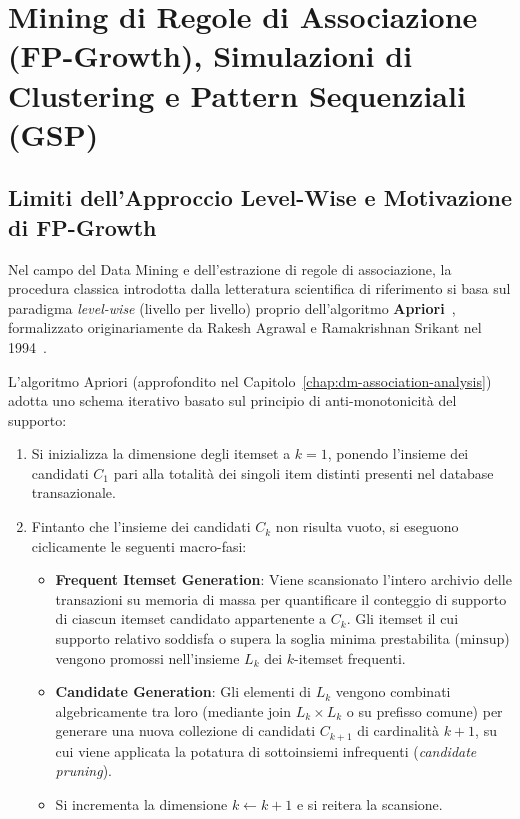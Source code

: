 \chapter{Mining di Regole di Associazione (FP-Growth), Simulazioni di Clustering e Pattern Sequenziali (GSP)}
\label{chap:dm-fp-growth-clustering-gsp}


\FloatBarrier
\section{Limiti dell'Approccio Level-Wise e Motivazione di FP-Growth}
\label{sec:dm-fp-motivation}

Nel campo del Data Mining e dell'estrazione di regole di associazione, la procedura classica introdotta dalla letteratura scientifica di riferimento si basa sul paradigma \textit{level-wise} (livello per livello) proprio dell'algoritmo \textbf{Apriori}~\cite{tan2018, agrawal1994}, formalizzato originariamente da Rakesh Agrawal e Ramakrishnan Srikant nel 1994~\cite{agrawal1994}.

L'algoritmo Apriori (approfondito nel Capitolo~\ref{chap:dm-association-analysis}) adotta uno schema iterativo basato sul principio di anti-monotonicità del supporto:
\begin{enumerate}[label=\textbf{\arabic*.}]
    \item Si inizializza la dimensione degli itemset a $k=1$, ponendo l'insieme dei candidati $C_1$ pari alla totalità dei singoli item distinti presenti nel database transazionale.
    \item Fintanto che l'insieme dei candidati $C_k$ non risulta vuoto, si eseguono ciclicamente le seguenti macro-fasi:
    \begin{itemize}
        \item \textbf{Frequent Itemset Generation}: Viene scansionato l'intero archivio delle transazioni su memoria di massa per quantificare il conteggio di supporto di ciascun itemset candidato appartenente a $C_k$. Gli itemset il cui supporto relativo soddisfa o supera la soglia minima prestabilita ($\text{minsup}$) vengono promossi nell'insieme $L_k$ dei $k$-itemset frequenti.
        \item \textbf{Candidate Generation}: Gli elementi di $L_k$ vengono combinati algebricamente tra loro (mediante join $L_k \times L_k$ o su prefisso comune) per generare una nuova collezione di candidati $C_{k+1}$ di cardinalità $k+1$, su cui viene applicata la potatura di sottoinsiemi infrequenti (\textit{candidate pruning}).
        \item Si incrementa la dimensione $k \leftarrow k+1$ e si reitera la scansione.
    \end{itemize}
\end{enumerate}

